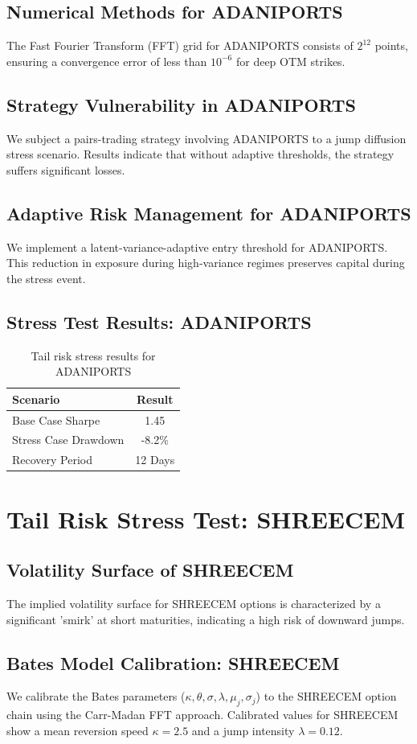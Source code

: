 \documentclass[12pt,a4paper,twoside]{article}
\begin{document}
\subsection{Numerical Methods for ADANIPORTS}
The Fast Fourier Transform (FFT) grid for ADANIPORTS consists of $2^{12}$ points, ensuring a convergence error of less than $10^{-6}$ for deep OTM strikes.
\subsection{Strategy Vulnerability in ADANIPORTS}
We subject a pairs-trading strategy involving ADANIPORTS to a jump diffusion stress scenario. Results indicate that without adaptive thresholds, the strategy suffers significant losses.
\subsection{Adaptive Risk Management for ADANIPORTS}
We implement a latent-variance-adaptive entry threshold for ADANIPORTS. This reduction in exposure during high-variance regimes preserves capital during the stress event.
\subsection{Stress Test Results: ADANIPORTS}
\begin{table}[H]
\centering
\begin{tabular}{|l|c|}
\hline
Scenario & Result \\
\hline
Base Case Sharpe & 1.45 \\
Stress Case Drawdown & -8.2\% \\
Recovery Period & 12 Days \\
\hline
\end{tabular}
\caption{Tail risk stress results for ADANIPORTS}
\end{table}
\newpage

\section{Tail Risk Stress Test: SHREECEM}
\subsection{Volatility Surface of SHREECEM}
The implied volatility surface for SHREECEM options is characterized by a significant 'smirk' at short maturities, indicating a high risk of downward jumps.
\subsection{Bates Model Calibration: SHREECEM}
We calibrate the Bates parameters ($\kappa, \theta, \sigma, \lambda, \mu_j, \sigma_j$) to the SHREECEM option chain using the Carr-Madan FFT approach.
Calibrated values for SHREECEM show a mean reversion speed $\kappa = 2.5$ and a jump intensity $\lambda = 0.12$.
\end{document}
